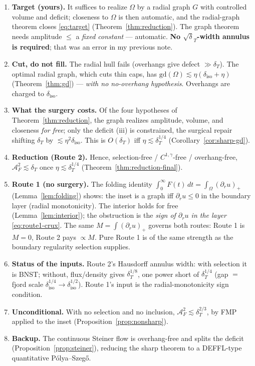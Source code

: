 \documentclass[11pt]{article}
\theoremstyle{definition}
\newcommand{\Om}{\Omega}
\newcommand{\dT}{\delta_T}
\newcommand{\diso}{\delta_{\mathrm{iso}}}
\newcommand{\AF}{\mathcal A_F}
\newcommand{\gd}{\mathrm{gd}}
\begin{document}
\begin{enumerate}[leftmargin=1.8em]
\item \textbf{Target (yours).} It suffices to realize $\Om$ by a radial
graph $G$ with controlled volume and deficit; closeness to $\Om$ is then
automatic, and the radial-graph theorem closes \eqref{eq:target}
(Theorem~\ref{thm:reduction}). The graph theorem needs amplitude $\le$ a
\emph{fixed constant} --- automatic. \textbf{No $\sqrt\dT$-width annulus is
required}; that was an error in my previous note.
\item \textbf{Cut, do not fill.} The radial hull fails (overhangs give
defect $\gg\dT$). The optimal radial graph, which cuts thin caps, has
$\gd(\Om)\lesssim\eta(\diso+\eta)$ (Theorem~\ref{thm:gd}) --- \emph{with no
no-overhang hypothesis}. Overhangs are charged to $\diso$.
\item \textbf{What the surgery costs.} Of the four hypotheses of
Theorem~\ref{thm:reduction}, the graph realizes amplitude, volume, and
closeness \emph{for free}; only the deficit (iii) is constrained, the
surgical repair shifting $\dT$ by $\lesssim\eta^2\diso$. This is $O(\dT)$
iff $\eta\lesssim\dT^{1/4}$ (Corollary~\ref{cor:sharp-gd}).
\item \textbf{Reduction (Route 2).} Hence, selection-free /
$C^{1,\gamma}$-free / overhang-free, $\AF^2\lesssim\dT$ once
$\eta\lesssim\dT^{1/4}$ (Theorem~\ref{thm:reduction-final}).
\item \textbf{Route 1 (no surgery).} The folding identity
$\int_0^\infty F(t)\,dt=\int_\Om(\partial_r u)_+$
(Lemma~\ref{lem:folding}) shows: the inset is a graph iff
$\partial_r u\le0$ in the boundary layer (radial monotonicity). The
interior holds for free (Lemma~\ref{lem:interior}); the obstruction is the
\emph{sign of $\partial_r u$ in the layer} \eqref{eq:route1-crux}. The same
$M=\int(\partial_r u)_+$ governs both routes: Route 1 is $M=0$, Route 2
pays $\propto M$. Pure Route 1 is of the same strength as the boundary
regularity selection supplies.
\item \textbf{Status of the inputs.} Route 2's Hausdorff annulus width:
with selection it is BNST; without, flux/density gives $\dT^{1/8}$, one
power short of $\dT^{1/4}$ (gap $=$ fjord scale
$\diso^{1/4}\to\diso^{1/2}$). Route 1's input is the radial-monotonicity
sign condition.
\item \textbf{Unconditional.} With no selection and no inclusion,
$\AF^2\lesssim\dT^{2/3}$, by FMP applied to the inset
(Proposition~\ref{prop:nonsharp}).
\item \textbf{Backup.} The continuous Steiner flow is overhang-free and
splits the deficit (Proposition~\ref{prop:steiner}), reducing the sharp
theorem to a DEFFL-type quantitative P\'olya--Szeg\H{o}.
\end{enumerate}
\end{document}
